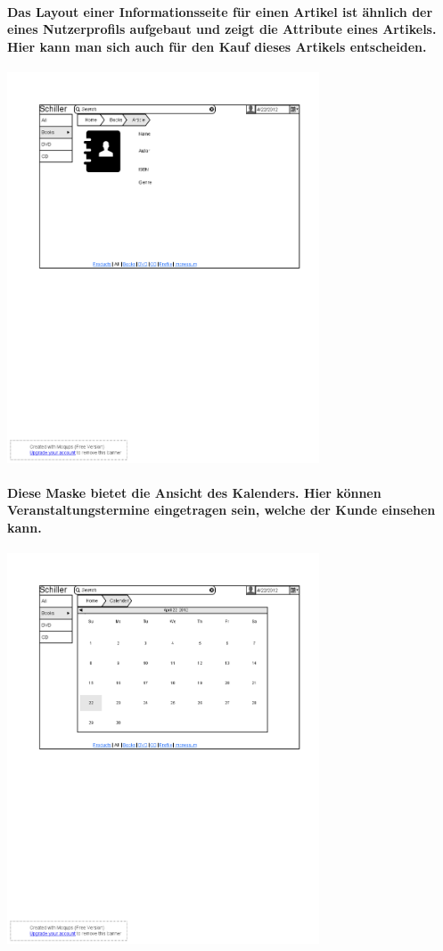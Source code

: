 \documentclass[a4paper]{article}
\begin{document}
\paragraph{Das Layout einer Informationsseite für einen Artikel ist ähnlich der eines Nutzerprofils aufgebaut und zeigt die Attribute eines Artikels. Hier kann man sich auch für den Kauf dieses Artikels entscheiden.\\}
\includegraphics[width=350px]{5ArticleView.png}

\paragraph{Diese Maske bietet die Ansicht des Kalenders. Hier können Veranstaltungstermine eingetragen sein, welche der Kunde einsehen kann.\\}
\includegraphics[width=350px]{6CalenderView.png}
\end{document}
